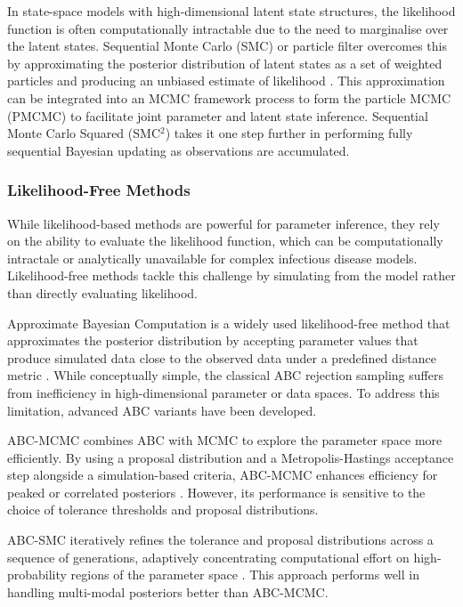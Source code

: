\documentclass{article}
\begin{document}
In state-space models with high-dimensional latent state structures, the likelihood function is often computationally intractable due to the need to marginalise over the latent states. Sequential Monte Carlo (SMC) or particle filter overcomes this by approximating the posterior distribution of latent states as a set of weighted particles and producing an unbiased estimate of likelihood \citep{doucet2001introduction, arulampalam2002tutorial}. This approximation can be integrated into an MCMC framework process to form the particle MCMC (PMCMC) \citep{andrieu2010particle, endo2019introduction} to facilitate joint parameter and latent state inference. Sequential Monte Carlo Squared (SMC$^2$) \citep{chopin2013smc2} takes it one step further in performing fully sequential Bayesian updating as observations are accumulated.

\subsubsection{Likelihood-Free Methods}

While likelihood-based methods are powerful for parameter inference, they rely on the ability to evaluate the likelihood function, which can be computationally intractale or analytically unavailable for complex infectious disease models. Likelihood-free methods tackle this challenge by simulating from the model rather than directly evaluating likelihood.

Approximate Bayesian Computation is a widely used likelihood-free method that approximates the posterior distribution by accepting parameter values that produce simulated data close to the observed data under a predefined distance metric \citep{rubin1984bayesianly, tavare1997inferring, beaumont2002approximate}. While conceptually simple, the classical ABC rejection sampling suffers from inefficiency in high-dimensional parameter or data spaces. To address this limitation, advanced ABC variants have been developed. 

ABC-MCMC combines ABC with MCMC to explore the parameter space more efficiently. By using a proposal distribution and a Metropolis-Hastings acceptance step alongside a simulation-based criteria, ABC-MCMC enhances efficiency for peaked or correlated posteriors \citep{marjoram2003markov, wegmann2009efficient, kypraios2017tutorial}. However, its performance is sensitive to the choice of tolerance thresholds and proposal distributions.

ABC-SMC iteratively refines the tolerance and proposal distributions across a sequence of generations, adaptively concentrating computational effort on high-probability regions of the parameter space \citep{sisson2007sequential, toni2009approximate, beaumont2009adaptive, drovandi2011likelihood}. This approach performs well in handling multi-modal posteriors better than ABC-MCMC.
\end{document}
